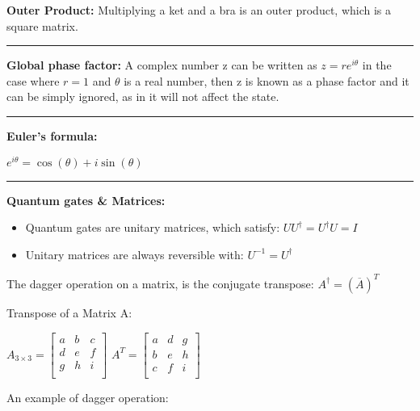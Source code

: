 \documentclass{article}
\begin{document}
\textbf{Outer Product:} Multiplying a ket and a bra is an outer product, which is a square matrix.

\vspace{5pt}
\hrule 
\vspace{5pt}

\textbf{Global phase factor:}
A complex number z can be written as $z = re^{i\theta} $ in the case where $ r= 1$ and $\theta$ is a real number, then z is known as a phase factor and it can be simply ignored, as in it will not affect the state.

\vspace{5pt}
\hrule
\vspace{5pt}

\textbf{Euler's formula:}
\begin{center}
$ e^{i\theta} = \cos(\theta) + i\sin(\theta) $
\end{center}

\vspace{5pt}
\hrule
\vspace{5pt}


\textbf{Quantum gates \& Matrices:}

\begin{itemize}
	\item Quantum gates are unitary matrices, which satisfy: $UU^\dagger = U^\dagger U = I$
	\item Unitary matrices are always reversible with: $U^{-1} = U^\dagger$
\end{itemize}

The dagger operation on a matrix, is the conjugate transpose:  $A^\dagger= (\overline{A})^T$

Transpose of a Matrix A:
\begin{center}
$
  A_{3\times3} =
  \left[ {\begin{array}{ccc}
    a & b & c \\
    d & e & f \\
    g & h & i \\
  \end{array} } \right]
$
\qquad
$
  A^T =
  \left[ {\begin{array}{ccc}
    a & d & g \\
    b & e & h \\
    c & f & i \\
  \end{array} } \right]
$
\end{center}

An example of dagger operation:
\end{document}
